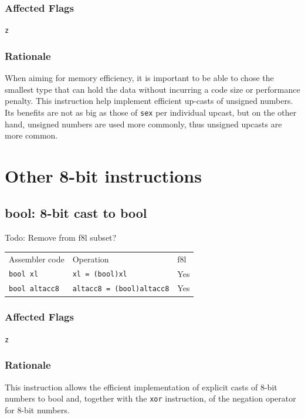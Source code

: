 \documentclass{book}
\begin{document}
\subsubsection*{Affected Flags}

\texttt{z}

\subsubsection*{Rationale}

When aiming for memory efficiency, it is important to be able to chose the smallest type that can hold the data without incurring a code size or performance penalty. This instruction help implement efficient up-casts of unsigned numbers. Its benefits are not as big as those of \texttt{sex} per individual upcast, but on the other hand, unsigned numbers are used more commonly, thus unsigned upcasts are more common.


\section{Other 8-bit instructions}

\subsection{bool: 8-bit cast to bool}

Todo: Remove from f8l subset?

\begin{tabular}{l l l}
Assembler code        & Operation                        & f8l \\
\texttt{bool xl}      & \texttt{xl = (bool)xl}           & Yes \\
\texttt{bool altacc8} & \texttt{altacc8 = (bool)altacc8} & Yes \\
\end{tabular}

\subsubsection*{Affected Flags}

\texttt{z}

\subsubsection*{Rationale}

This instruction allows the efficient implementation of explicit casts of 8-bit numbers to bool and, together with the \texttt{xor} instruction, of the negation operator for 8-bit numbers.
\end{document}
